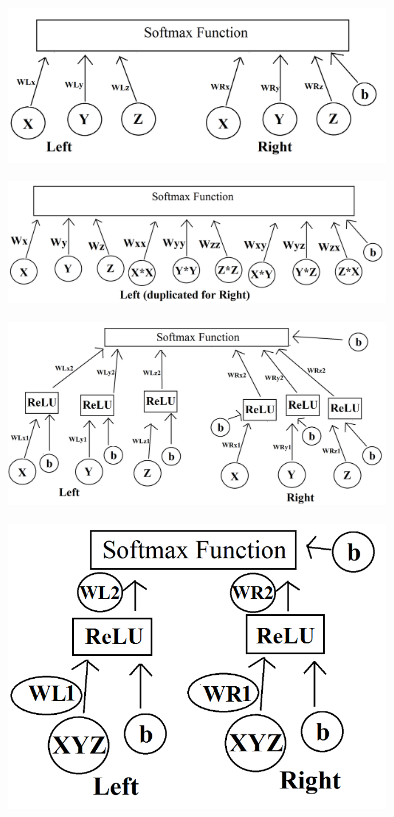 \documentclass[]{report}
\begin{document}
\begin{minipage}{\linewidth}
	\begin{minipage}{0.49\textwidth}
		\centering
		\includegraphics[width=0.75\textwidth]{../original}
	\end{minipage}
	\hfill
	\begin{minipage}{0.49\textwidth}
		\centering
		\includegraphics[width=0.75\textwidth]{../complex}
	\end{minipage}
\end{minipage}
\begin{minipage}{\linewidth}
	\begin{minipage}{0.49\textwidth}
		\centering
		\includegraphics[width=0.75\textwidth]{../layered}
	\end{minipage}
	\hfill
	\begin{minipage}{0.49\textwidth}
		\centering
		\includegraphics[width=0.75\textwidth]{../xyz1}
	\end{minipage}
\end{minipage}
\\
\end{document}
